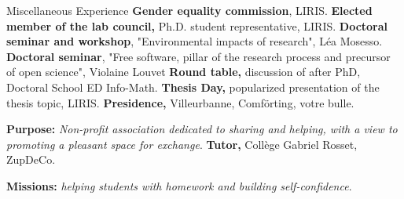 \begin{rubric}{Miscellaneous Experience}
 \textbf{Gender equality commission}, LIRIS.
 \textbf{Elected member of the lab council,} Ph.D. student representative, LIRIS.
%
\entry*[June 21st, 2025] \textbf{Doctoral seminar and workshop}, "Environmental impacts of research", Léa Mosesso.
%
\entry*[June 20th,  2024] \textbf{Doctoral seminar}, "Free software, pillar of the research process and precursor of open science", Violaine Louvet
%
\entry*[June 17th, 2026] \textbf{Round table,} discussion of after PhD, Doctoral School ED Info-Math.
\entry*[October 17th, 2024] \textbf{Thesis Day,} popularized presentation of the thesis topic, LIRIS.
%
%
	\textbf{Presidence,} Villeurbanne, Comförting, votre bulle.
    \par \textbf{Purpose:} \emph{Non-profit association dedicated to sharing and helping, with a view to promoting a pleasant space for exchange}.
%
	\textbf{Tutor,} Collège Gabriel Rosset, ZupDeCo.   
    \par \textbf{Missions:} \emph{helping students with homework and building self-confidence}.
\end{rubric}